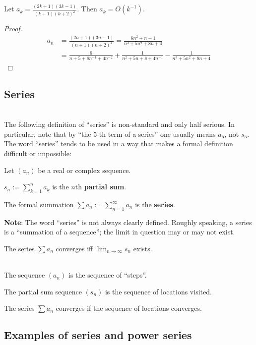 \begin{claim*}
  Let $a_k = \frac{(2k+1)(3k-1)}{(k+1)(k+2)^2}$. Then $a_k = O(k^{-1})$.
\end{claim*}

\begin{proof}
  \begin{align*}
    a_n &= \frac{(2n+1)(3n-1)}{(n+1)(n+2)^2}
         = \frac{6n^2 + n - 1}{n^3 + 5n^2 + 8n + 4}\\
        &=
          \frac{6}{n + 5 + 8n^{-1} + 4n^{-2}} +
          \frac{1}{n^2 + 5n + 8 + 4n^{-1}} -
          \frac{1}{n^3 + 5n^2 + 8n + 4}
  \end{align*}
\end{proof}


\subsection{Series}
\begin{definition*}~\\

   The following definition of ``series'' is non-standard and only half serious. In
  particular, note that by ``the 5-th term of a series'' one usually means $a_5$, not $s_5$. The
  word ``series'' tends to be used in a way that makes a formal definition difficult or impossible:


  Let $(a_n)$ be a real or complex sequence.

  $s_n := \sum_{k=1}^na_k$ is the $n$th {\bf partial sum}.

  The formal summation $\sum a_n := \sum_{n=1}^\infty a_n$ is the {\bf series}.

  {\bf Note}: The word ``series'' is not always clearly defined. Roughly speaking, a series is a
  ``summation of a sequence''; the limit in question may or may not exist.

  The series $\sum a_n$ converges iff $\lim_{n \to \infty} s_n$ exists.
\end{definition*}

\begin{intuition*}~\\
  The sequence $(a_n)$ is the sequence of ``steps''.

  The partial sum sequence $(s_n)$ is the sequence of locations visited.

  The series $\sum a_n$ converges if the sequence of locations converges.
\end{intuition*}

\subsection{Examples of series and power series}

